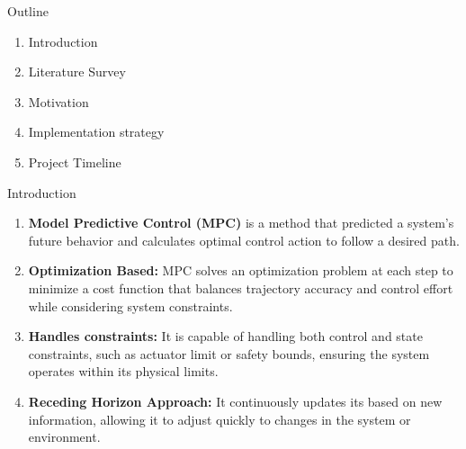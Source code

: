 \documentclass{beamer}
\begin{document}
\begin{frame}\titlepage\end{frame}


\begin{frame}{Outline}
    \begin{enumerate}
        \item Introduction
        \item Literature Survey
        \item Motivation
        \item Implementation strategy
        \item Project Timeline
    \end{enumerate}
\end{frame}


\begin{frame}{Introduction}
    \begin{enumerate}
        \item \textbf{Model Predictive Control (MPC)} is a method that predicted a system's future behavior and calculates optimal control action to follow a desired path.
        \item \textbf{Optimization Based:} MPC solves an optimization problem at each step to minimize a cost function that balances trajectory accuracy and control effort while considering system constraints.
        \item \textbf{Handles constraints:} It is capable of handling both control and state constraints, such as actuator limit or safety bounds, ensuring the system operates within its physical limits.
        \item \textbf{Receding Horizon Approach:} It continuously updates its based on new information, allowing it to adjust quickly to changes in the system or environment.
    \end{enumerate}
\end{frame}\normalfont
\end{document}
